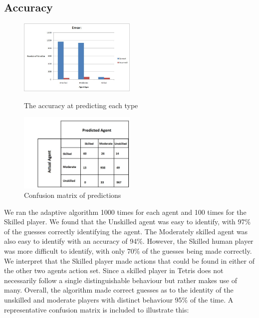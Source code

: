 \documentclass[11pt]{article}
\begin{document}
\subsection{     Accuracy}
\FloatBarrier
\begin{figure}[!h]
	\centering
	\includegraphics[width=0.5\textwidth]{accuracy.jpg}
	\caption{The accuracy at predicting each type}	
	\includegraphics[width=0.5\textwidth]{confuse.jpg}
	\caption{Confusion matrix of predictions}
	\label{Figure 3}
\end{figure}
\FloatBarrier
We ran the adaptive algorithm 1000 times for each agent and 100 times for the Skilled player. We found that the Unskilled agent was easy to identify, with 97\% of the guesses correctly identifying the agent. The Moderately skilled agent was also easy to identify with an accuracy of 94\%. However, the Skilled human player was more difficult to identify, with only 70\% of the guesses being made correctly. We interpret that the Skilled player made actions that could be found in either of the other two agents action set. Since a skilled player in Tetris does not necessarily follow a single distinguishable behaviour but rather makes use of many.
Overall, the algorithm made correct guesses as to the identity of the unskilled and moderate players with distinct behaviour 95\% of the time. A representative confusion matrix is included to illustrate this:
\end{document}
